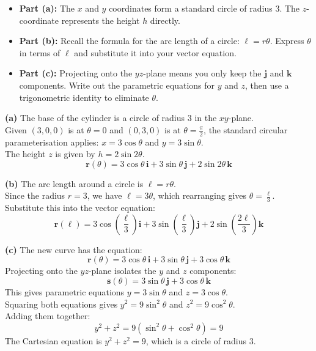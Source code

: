 \begin{hint}
\begin{itemize}[leftmargin=*]
    \item \textbf{Part (a):} The $x$ and $y$ coordinates form a standard circle of radius $3$. The $z$-coordinate represents the height $h$ directly. 
    \item \textbf{Part (b):} Recall the formula for the arc length of a circle: $\ell = r\theta$. Express $\theta$ in terms of $\ell$ and substitute it into your vector equation.
    \item \textbf{Part (c):} Projecting onto the $yz$-plane means you only keep the $\mathbf{j}$ and $\mathbf{k}$ components. Write out the parametric equations for $y$ and $z$, then use a trigonometric identity to eliminate $\theta$.
\end{itemize}
\end{hint}

\begin{solution}
\textbf{(a)} The base of the cylinder is a circle of radius $3$ in the $xy$-plane. \\
Given $(3,0,0)$ is at $\theta=0$ and $(0,3,0)$ is at $\theta = \frac{\pi}{2}$, the standard circular parameterisation applies: 
$x = 3\cos\theta$ and $y = 3\sin\theta$. \\
The height $z$ is given by $h = 2\sin 2\theta$.
$$ \mathbf{r}(\theta) = 3\cos\theta \, \mathbf{i} + 3\sin\theta \, \mathbf{j} + 2\sin 2\theta \, \mathbf{k} $$

\textbf{(b)} The arc length around a circle is $\ell = r\theta$. \\
Since the radius $r = 3$, we have $\ell = 3\theta$, which rearranging gives $\theta = \frac{\ell}{3}$. \\
Substitute this into the vector equation:
$$ \mathbf{r}(\ell) = 3\cos\left(\frac{\ell}{3}\right) \mathbf{i} + 3\sin\left(\frac{\ell}{3}\right) \mathbf{j} + 2\sin\left(\frac{2\ell}{3}\right) \mathbf{k} $$

\textbf{(c)} The new curve has the equation:
$$ \mathbf{r}(\theta) = 3\cos\theta \, \mathbf{i} + 3\sin\theta \, \mathbf{j} + 3\cos\theta \, \mathbf{k} $$
Projecting onto the $yz$-plane isolates the $y$ and $z$ components:
$$ \mathbf{s}(\theta) = 3\sin\theta \, \mathbf{j} + 3\cos\theta \, \mathbf{k} $$
This gives parametric equations $y = 3\sin\theta$ and $z = 3\cos\theta$. \\
Squaring both equations gives $y^2 = 9\sin^2\theta$ and $z^2 = 9\cos^2\theta$. \\
Adding them together:
$$ y^2 + z^2 = 9(\sin^2\theta + \cos^2\theta) = 9 $$
The Cartesian equation is $y^2 + z^2 = 9$, which is a circle of radius $3$.
\end{solution}

